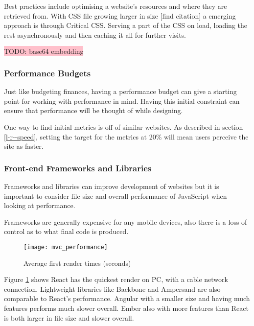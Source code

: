 Best practices include optimising a website's resources and where they are retrieved from. With CSS file growing larger in size [find citation] a emerging approach is through Critical CSS. Serving a part of the CSS on load, loading the rest asynchronously and then caching it all for further visits. \cite{fast_as_heck}

\colorbox{pink}{TODO: base64 embedding}

\subsubsection{Performance Budgets} \label{l-r--performance-budgets}

Just like budgeting finances, having a performance budget can give a starting point for working with performance in mind. Having this initial constraint can ensure that performance will be thought of while designing. \cite{performance_budget}

One way to find initial metrics is off of similar websites. As described in section \ref{l-r--speed}, setting the target for the metrics at 20\% will mean users perceive the site as faster.

\subsubsection{Front-end Frameworks and Libraries} \label{l-r--frameworks}

Frameworks and libraries can improve development of websites but it is important to consider file size and overall performance of JavaScript when looking at performance.

Frameworks are generally expensive for any mobile devices, also there is a loss of control as to what final code is produced. \cite{cost_of_frameworks}

\begin{figure}[H]
  \centering
    \texttt{[image: mvc\_performance]}
  \caption{Average first render times (seconds) \protect\cite{performance_mvc}}
  \label{figure-average-first-render}
\end{figure}

Figure \ref{figure-average-first-render} shows React has the quickest render on PC, with a cable network connection. Lightweight libraries like Backbone and Ampersand are also comparable to React's performance. Angular with a smaller size and  having much features performs much slower overall. Ember also with more features than React is both larger in file size and slower overall.

